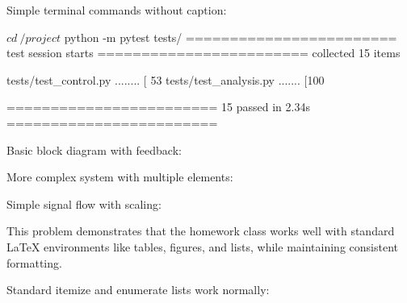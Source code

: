 \documentclass{homework}
\begin{document}
\subproblem
Simple terminal commands without caption:

\begin{hwterminal}
$ cd ~/project
$ python -m pytest tests/
======================== test session starts ========================
collected 15 items

tests/test_control.py ........               [ 53%
tests/test_analysis.py .......               [100%

======================== 15 passed in 2.34s ========================
\end{hwterminal}


\subproblem
Basic block diagram with feedback:

\begin{hwblocks}
\end{hwblocks}

\subproblem
More complex system with multiple elements:

\begin{hwblocks}[scale=0.8, transform shape]
\end{hwblocks}

\subproblem
Simple signal flow with scaling:

\begin{hwblocks}[scale=0.85, transform shape]
\end{hwblocks}


This problem demonstrates that the homework class works well with standard LaTeX environments like tables, figures, and lists, while maintaining consistent formatting.

\subproblem
Standard itemize and enumerate lists work normally:
\end{document}
